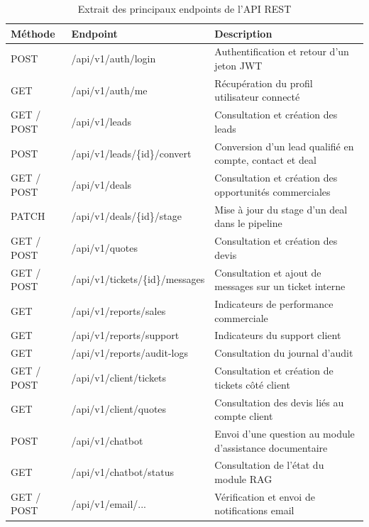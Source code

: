 \begin{table}[H]
\centering
\footnotesize
\caption{Extrait des principaux endpoints de l'API REST}
\label{tab:api}
\begin{tabularx}{\textwidth}{|l|l|X|}
\hline
\textbf{Méthode} & \textbf{Endpoint} & \textbf{Description} \\
\hline
POST & /api/v1/auth/login & Authentification et retour d'un jeton JWT \\
\hline
GET & /api/v1/auth/me & Récupération du profil utilisateur connecté \\
\hline
GET / POST & /api/v1/leads & Consultation et création des leads \\
\hline
POST & /api/v1/leads/\{id\}/convert & Conversion d'un lead qualifié en compte, contact et deal \\
\hline
GET / POST & /api/v1/deals & Consultation et création des opportunités commerciales \\
\hline
PATCH & /api/v1/deals/\{id\}/stage & Mise à jour du stage d'un deal dans le pipeline \\
\hline
GET / POST & /api/v1/quotes & Consultation et création des devis \\
\hline
GET / POST & /api/v1/tickets/\{id\}/messages & Consultation et ajout de messages sur un ticket interne \\
\hline
GET & /api/v1/reports/sales & Indicateurs de performance commerciale \\
\hline
GET & /api/v1/reports/support & Indicateurs du support client \\
\hline
GET & /api/v1/reports/audit-logs & Consultation du journal d'audit \\
\hline
GET / POST & /api/v1/client/tickets & Consultation et création de tickets côté client \\
\hline
GET & /api/v1/client/quotes & Consultation des devis liés au compte client \\
\hline
POST & /api/v1/chatbot & Envoi d'une question au module d'assistance documentaire \\
\hline
GET & /api/v1/chatbot/status & Consultation de l'état du module RAG \\
\hline
GET / POST & /api/v1/email/... & Vérification et envoi de notifications email \\
\hline
\end{tabularx}
\end{table}

